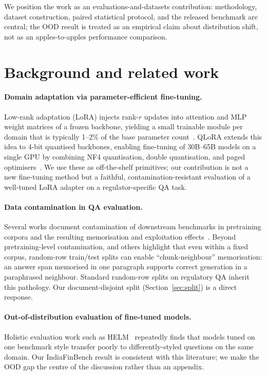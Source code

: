 \documentclass{article}
\begin{document}
We position the work as an evaluations-and-datasets contribution: methodology, dataset construction, paired statistical protocol, and the released benchmark are central; the OOD result is treated as an empirical claim about distribution shift, not as an apples-to-apples performance comparison.

\section{Background and related work}

\paragraph{Domain adaptation via parameter-efficient fine-tuning.} Low-rank adaptation (LoRA) injects rank-$r$ updates into attention and MLP weight matrices of a frozen backbone, yielding a small trainable module per domain that is typically 1--2\% of the base parameter count~\citep{hu2021lora}. QLoRA extends this idea to 4-bit quantised backbones, enabling fine-tuning of 30B--65B models on a single GPU by combining NF4 quantisation, double quantisation, and paged optimisers~\citep{dettmers2023qlora}. We use these as off-the-shelf primitives; our contribution is not a new fine-tuning method but a faithful, contamination-resistant evaluation of a well-tuned LoRA adapter on a regulator-specific QA task.

\paragraph{Data contamination in QA evaluation.} Several works document contamination of downstream benchmarks in pretraining corpora and the resulting memorisation and exploitation effects~\citep{magar2022data}. Beyond pretraining-level contamination, \citet{magar2022data} and others highlight that even within a fixed corpus, random-row train/test splits can enable ``chunk-neighbour'' memorisation: an answer span memorised in one paragraph supports correct generation in a paraphrased neighbour. Standard random-row splits on regulatory QA inherit this pathology. Our document-disjoint split (Section~\ref{sec:split}) is a direct response.

\paragraph{Out-of-distribution evaluation of fine-tuned models.} Holistic evaluation work such as HELM~\citep{liang2022helm} repeatedly finds that models tuned on one benchmark style transfer poorly to differently-styled questions on the same domain. Our IndiaFinBench result is consistent with this literature; we make the OOD gap the centre of the discussion rather than an appendix.
\end{document}
